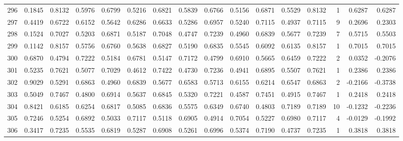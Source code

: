 \begin{tabular}{lrrrrrrrrrrrrrrr}
296 &      0.1845 &  0.8132 &  0.5976 &  0.6799 &  0.5216 &  0.6821 &  0.5839 &  0.6766 &  0.5156 &  0.6871 &   0.5529 &     0.8132 &      1 &                    0.6287 &                     0.6287 \\
297 &      0.4419 &  0.6722 &  0.6152 &  0.5642 &  0.6286 &  0.6633 &  0.5286 &  0.6957 &  0.5240 &  0.7115 &   0.4937 &     0.7115 &      9 &                    0.2696 &                     0.2303 \\
298 &      0.1524 &  0.7027 &  0.5203 &  0.6871 &  0.5187 &  0.7048 &  0.4747 &  0.7239 &  0.4960 &  0.6839 &   0.5677 &     0.7239 &      7 &                    0.5715 &                     0.5503 \\
299 &      0.1142 &  0.8157 &  0.5756 &  0.6760 &  0.5638 &  0.6827 &  0.5190 &  0.6835 &  0.5545 &  0.6092 &   0.6135 &     0.8157 &      1 &                    0.7015 &                     0.7015 \\
300 &      0.6870 &  0.4794 &  0.7222 &  0.5184 &  0.6781 &  0.5147 &  0.7172 &  0.4799 &  0.6910 &  0.5665 &   0.6459 &     0.7222 &      2 &                    0.0352 &                    -0.2076 \\
301 &      0.5235 &  0.7621 &  0.5077 &  0.7029 &  0.4612 &  0.7422 &  0.4730 &  0.7236 &  0.4941 &  0.6895 &   0.5507 &     0.7621 &      1 &                    0.2386 &                     0.2386 \\
302 &      0.9029 &  0.5291 &  0.6863 &  0.4960 &  0.6839 &  0.5677 &  0.6583 &  0.5713 &  0.6155 &  0.6214 &   0.6547 &     0.6863 &      2 &                   -0.2166 &                    -0.3738 \\
303 &      0.5049 &  0.7467 &  0.4800 &  0.6914 &  0.5637 &  0.6845 &  0.5320 &  0.7221 &  0.4587 &  0.7451 &   0.4915 &     0.7467 &      1 &                    0.2418 &                     0.2418 \\
304 &      0.8421 &  0.6185 &  0.6254 &  0.6817 &  0.5085 &  0.6836 &  0.5575 &  0.6349 &  0.6740 &  0.4803 &   0.7189 &     0.7189 &     10 &                   -0.1232 &                    -0.2236 \\
305 &      0.7246 &  0.5254 &  0.6892 &  0.5033 &  0.7117 &  0.5118 &  0.6905 &  0.4914 &  0.7054 &  0.5227 &   0.6980 &     0.7117 &      4 &                   -0.0129 &                    -0.1992 \\
306 &      0.3417 &  0.7235 &  0.5535 &  0.6819 &  0.5287 &  0.6908 &  0.5261 &  0.6996 &  0.5374 &  0.7190 &   0.4737 &     0.7235 &      1 &                    0.3818 &                     0.3818 \\

\end{tabular}
